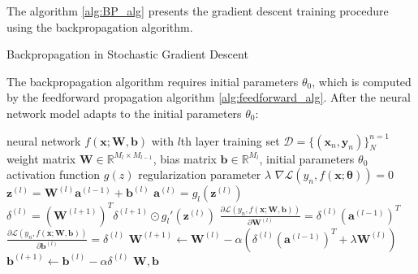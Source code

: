 \documentclass[
	parskip, 			   %
	twoside, 			   %
	DIV=14, 			   %
	BCOR=15.0mm, 		   %
	headsepline, 		   %
	open=right, 		   %
	captions=tableheading, %
	bibliography=totoc,    %
	numbers=noenddot       %
]{scrreprt}
\begin{document}
The algorithm \ref{alg:BP_alg} presents the gradient descent training procedure using the backpropagation algorithm.

\clearpage
\begin{algorithm}[h!]
\caption{Backpropagation in Stochastic Gradient Descent}
The backpropagation algorithm requires initial parameters $\theta_{0}$, which is computed by the feedforward propagation algorithm \ref{alg:feedforward_alg}. After the neural network model adapts to the initial parameters $\theta_{0}$:
\label{alg:BP_alg}
    \begin{algorithmic}
    \Require neural network $f(\mathbf{x};\mathbf{W},\mathbf{b})$ with $l$th layer
    \Require training set $\mathcal{D}=\{(\mathbf{x}_{n}, \mathbf{y}_{n})\}_{N}^{n=1}$
    \Require weight matrix $\mathbf{W} \in \mathbb{R}^{M_{l} \times M_{l-1}}$, bias matrix $\mathbf{b} \in \mathbb{R}^{M_{l}}$, initial parameters $\theta_{0}$
    \Require activation function $g(z)$
    \Require regularization parameter $\lambda$
    \Ensure $\nabla \mathcal{L}\left( y_{n},f(\mathbf{x};\mathbf{\theta}) \right) = 0$
            \State $\mathbf{z}^{(l)} = \mathbf{W}^{(l)} \mathbf{a}^{(l-1)} + \mathbf{b}^{(l)}$ 
            \State $\mathbf{a}^{(l)} = g_{l}(\mathbf{z}^{(l)})$ 
            \State {}
            \State $\delta^{(l)} = (\mathbf{W}^{(l+1)})^T \delta^{(l+1)} \odot g_{l}'(\mathbf{z}^{(l)})$ 
            \State {}
            \State $\frac{\partial \mathcal{L}\left( y_n,f(\mathbf{x};\mathbf{\mathbf{W},\mathbf{b}}) \right)}{\partial \mathbf{W}^{(l)}} = \delta^{(l)} (\mathbf{a}^{(l-1)})^T$ 
            \State $\frac{\partial \mathcal{L}\left( y_n,f(\mathbf{x};\mathbf{\mathbf{W},\mathbf{b}}) \right)}{\partial \mathbf{b}^{(l)}} = \delta^{(l)}$ 
            \State {}
            \State $\mathbf{W}^{(l+1)} \gets  \mathbf{W}^{(l)}-\alpha (\delta^{(l)} (\mathbf{a}^{(l-1)})^T + \lambda \mathbf{W}^{(l)})$ 
            \State $\mathbf{b}^{(l+1)} \gets  \mathbf{b}^{(l)}-\alpha \delta^{(l)}$ 
            \State {}
        \EndFor
    \EndFor
    \EndWhile
    \State \Return $\mathbf{W}, \mathbf{b}$ 
    \end{algorithmic}
\end{algorithm}
\end{document}
